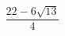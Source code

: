 \documentclass[preview]{standalone}
\begin{document}
\begin{align*}
\dfrac{22 - 6\sqrt{13} }{4}
\end{align*}
\end{document}
